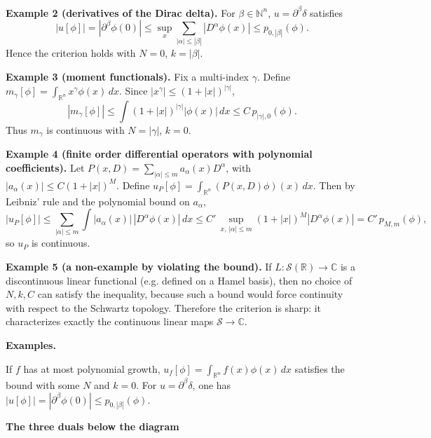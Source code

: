 \begin{problem}[CP-III-0024]
\medskip

\textbf{Example 2 (derivatives of the Dirac delta).}
For $\beta\in\mathbb N^n$, $u=\partial^\beta\delta$ satisfies
\[
|u[\phi]|=|\partial^\beta\phi(0)|
\le \sup_{x} \sum_{|\alpha|\le |\beta|} |D^\alpha\phi(x)|
\le p_{0,|\beta|}(\phi).
\]
Hence the criterion holds with $N=0$, $k=|\beta|$.

\medskip

\textbf{Example 3 (moment functionals).}
Fix a multi-index $\gamma$. Define $m_\gamma[\phi]=\int_{\mathbb R^n} x^\gamma \phi(x)\,dx$.
Since $|x^\gamma|\le (1+|x|)^{|\gamma|}$,
\[
|m_\gamma[\phi]|
\le \int (1+|x|)^{|\gamma|} |\phi(x)|\,dx
\le C\, p_{|\gamma|,0}(\phi).
\]
Thus $m_\gamma$ is continuous with $N=|\gamma|$, $k=0$.

\medskip

\textbf{Example 4 (finite order differential operators with polynomial coefficients).}
Let $P(x,D)=\sum_{|\alpha|\le m} a_\alpha(x) D^\alpha$, with $|a_\alpha(x)|\le C(1+|x|)^M$.
Define $u_P[\phi]=\int_{\mathbb R^n} (P(x,D)\phi)(x)\,dx$.
Then by Leibniz' rule and the polynomial bound on $a_\alpha$,
\[
|u_P[\phi]|
\le \sum_{|\alpha|\le m} \int |a_\alpha(x)|\,|D^\alpha\phi(x)|\,dx
\le C'\,\sup_{x,\,|\alpha|\le m} (1+|x|)^M |D^\alpha\phi(x)|
= C'\,p_{M,m}(\phi),
\]
so $u_P$ is continuous.

\medskip

\textbf{Example 5 (a non-example by violating the bound).}
If $L:\mathcal S(\mathbb R)\to\mathbb C$ is a discontinuous linear functional (e.g. defined on a Hamel basis),
then no choice of $N,k,C$ can satisfy the inequality, because such a bound would force continuity with respect to the Schwartz topology. Therefore the criterion is sharp: it characterizes exactly the continuous linear maps $\mathcal S\to\mathbb C$.


\par\smallskip\noindent\textbf{Examples.}\quad

If $f$ has at most polynomial growth, $u_f[\phi]=\int_{\mathbb R^n} f(x)\phi(x)\,dx$ satisfies the bound with some $N$ and $k=0$.
For $u=\partial^\beta\delta$, one has $|u[\phi]|=|\partial^\beta\phi(0)|\le p_{0,|\beta|}(\phi)$.


\par\medskip\noindent\textbf{The three duals below the diagram}\quad


\end{problem}
